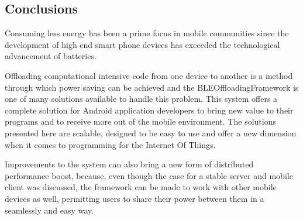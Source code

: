 \documentclass[twoside]{article}
\begin{document}
\begin{multicols}{2}
\section{Conclusions}
\label{conclusions}

Consuming less energy has been a prime focus in mobile communities since the development of high end smart phone devices has exceeded the technological advancement of batteries.

Offloading computational intensive code from one device to another is a method through which power saving can be achieved and the BLEOffloadingFramework is one of many solutions available to handle this problem. This system offers a complete solution for Android application developers to bring new value to their programs and to receive more out of the mobile environment. The solutions presented here are scalable, designed to be easy to use and offer a new dimension when it comes to programming for the Internet Of Things.

Improvements to the system can also bring a new form of distributed performance boost, because, even though the case for a stable server and mobile client was discussed, the framework can be made to work with other mobile devices as well, permitting users to share their power between them in a seamlessly and easy way.


\end{multicols}
\end{document}
